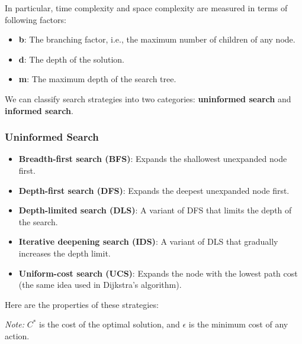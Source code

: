 \documentclass[a4paper,12pt]{article}
\begin{document}
In particular, time complexity and space complexity are measured in terms of following factors:
\begin{itemize}
  \item \textbf{b}: The branching factor, i.e., the maximum number of children of any node.
  \item \textbf{d}: The depth of the solution.
  \item \textbf{m}: The maximum depth of the search tree.
\end{itemize}

We can classify search strategies into two categories: \textbf{uninformed search} and \textbf{informed search}.

\subsubsection{Uninformed Search}

\begin{itemize}
  \item \textbf{Breadth-first search (BFS)}: Expands the shallowest unexpanded node first.
  \item \textbf{Depth-first search (DFS)}: Expands the deepest unexpanded node first.
  \item \textbf{Depth-limited search (DLS)}: A variant of DFS that limits the depth of the search.
  \item \textbf{Iterative deepening search (IDS)}: A variant of DLS that gradually increases the depth limit.
  \item \textbf{Uniform-cost search (UCS)}: Expands the node with the lowest path cost (the same idea used in Dijkstra's algorithm).
\end{itemize}

Here are the properties of these strategies:
\begin{table}[H]
\end{table}
\textit{Note:} $C^*$ is the cost of the optimal solution, and $\epsilon$ is the minimum cost of any action.
\end{document}
